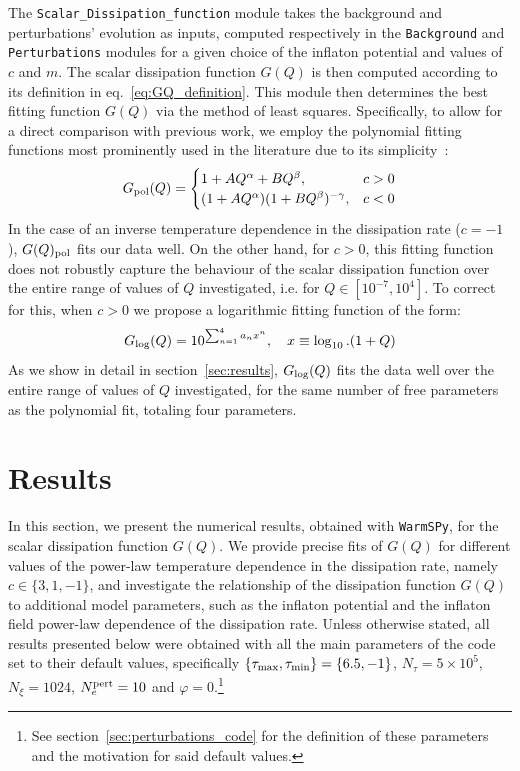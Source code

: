 \documentclass[a4paper,11pt]{article}
\begin{document}
The \texttt{Scalar\_Dissipation\_function} module takes the background and perturbations' evolution as inputs, computed respectively in the \texttt{Background} and \texttt{Perturbations} modules for a given choice of the inflaton potential and values of $c$ and $m$. The scalar dissipation function $G(Q)$ is then computed according to its definition in eq.~\eqref{eq:GQ_definition}. This module then determines the best fitting function $G(Q)$ via the method of least squares. Specifically, to allow for a direct comparison with previous work, we employ the polynomial fitting functions most prominently used in the literature due to its simplicity~\cite{Bastero-Gil:2016qru,Benetti:2016jhf,Montefalcone:2022jfw, Motaharfar:2018zyb}:
\begin{equation}
G_{\rm{pol}}(Q)=\begin{cases}
1+AQ^{\alpha}+BQ^{\beta},  & c>0 \\
(1+AQ^{\alpha})(1+BQ^{\beta})^{-\gamma}, & c<0
\end{cases}\label{eq:GQ_pol} 
\end{equation}
In the case of an inverse temperature
dependence in the dissipation rate ($c=-1$), $G(Q)_{\rm{pol}}$ fits our data well. On the other hand, for $c>0$, this fitting function does not robustly capture the behaviour of the scalar dissipation function over the entire range of values of $Q$ investigated, i.e. for $Q\in [10^{-7}, 10^{4}]$. To correct for this, when $c>0$ we propose a logarithmic fitting function of the form:
\begin{equation}
    G_{\rm{log}}(Q)=10^{\sum_{n=1}^4 a_n x^n}, \quad x\equiv\log_{10}.(1+Q)\label{eq:GQ_log}
\end{equation}
As we show in detail in section~\ref{sec:results}, $G_{\rm{log}}(Q)$ fits the data well over the entire range of values of $Q$ investigated, for the same number of free parameters as the polynomial fit, totaling four parameters.

\section{Results \label{sec:results}}

In this section, we present the numerical results, obtained with \texttt{WarmSPy}, for the scalar dissipation function $G(Q)$. We provide precise fits of $G(Q)$ for different values of the power-law temperature
dependence in the dissipation rate, namely $c\in \{3, 1, -1\}$, and investigate the relationship of the dissipation function $G(Q)$
to additional model parameters, such as the inflaton potential and the inflaton field power-law dependence of the dissipation rate. Unless otherwise stated, all results presented below were obtained with all the main parameters of the code set to their default values, specifically $\{\tau_{\rm{max}},\tau_{\rm{min}}\}=\{6.5,-1\}$, $N_\tau=5\times10^{5}$, $N_\xi=1024$, $N_e^{\rm{pert}}=10$ and $\varphi=0$.\footnote{See section~\ref{sec:perturbations_code} for the definition of these parameters and the motivation for said default values.}
\end{document}
